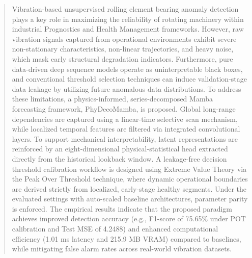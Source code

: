 \documentclass[runningheads]{llncs}
\begin{document}
\begin{abstract}
Vibration-based unsupervised rolling element bearing anomaly detection plays a key role in maximizing the reliability of rotating machinery within industrial Prognostics and Health Management frameworks. However, raw vibration signals captured from operational environments exhibit severe non-stationary characteristics, non-linear trajectories, and heavy noise, which mask early structural degradation indicators. Furthermore, pure data-driven deep sequence models operate as uninterpretable black boxes, and conventional threshold selection techniques can induce validation-stage data leakage by utilizing future anomalous data distributions. To address these limitations, a physics-informed, series-decomposed Mamba forecasting framework, PhyDecoMamba, is proposed. Global long-range dependencies are captured using a linear-time selective scan mechanism, while localized temporal features are filtered via integrated convolutional layers. To support mechanical interpretability, latent representations are reinforced by an eight-dimensional physical-statistical head extracted directly from the historical lookback window. A leakage-free decision threshold calibration workflow is designed using Extreme Value Theory via the Peak Over Threshold technique, where dynamic operational boundaries are derived strictly from localized, early-stage healthy segments. Under the evaluated settings with auto-scaled baseline architectures, parameter parity is enforced. The empirical results indicate that the proposed paradigm achieves improved detection accuracy (e.g., F1-score of 75.65\% under POT calibration and Test MSE of 4.2488) and enhanced computational efficiency (1.01 ms latency and 215.9 MB VRAM) compared to baselines, while mitigating false alarm rates across real-world vibration datasets.

\end{abstract}
%
%
%
\end{document}
